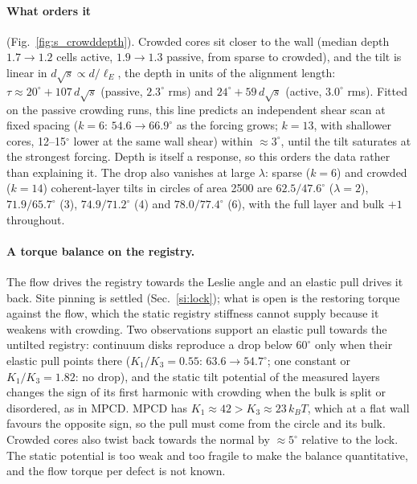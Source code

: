 \documentclass[aps,prl,onecolumn,superscriptaddress,amsmath,amssymb,nofootinbib]{revtex4-2}
\newcommand{\kT}{k_BT}
\begin{document}
\paragraph{What orders it} (Fig.~\ref{fig:s_crowddepth}). Crowded cores sit closer to the wall (median depth $1.7\to1.2$ cells active, $1.9\to1.3$ passive, from sparse to crowded), and
the tilt is linear in $d\sqrt{s}\propto d/\ell_E$, the depth in units of the alignment length: $\tau\approx20^\circ+107\,d\sqrt{s}$ (passive, $2.3^\circ$ rms) and $24^\circ+59\,d\sqrt{s}$
(active, $3.0^\circ$ rms). Fitted on the passive crowding runs, this line predicts an independent shear scan at fixed spacing ($k=6$: $54.6\to66.9^\circ$ as the forcing grows; $k=13$,
with shallower cores, 12--15$^\circ$ lower at the same wall shear) within $\approx3^\circ$, until the tilt saturates at the strongest forcing. Depth is itself a response, so this orders
the data rather than explaining it. The drop also vanishes at large $\lambda$: sparse ($k=6$) and crowded ($k=14$) coherent-layer tilts in circles of area 2500 are $62.5/47.6^\circ$
($\lambda=2$), $71.9/65.7^\circ$ (3), $74.9/71.2^\circ$ (4) and $78.0/77.4^\circ$ (6), with the full layer and bulk $+1$ throughout.

\paragraph{A torque balance on the registry.} The flow drives the registry towards the Leslie angle and an elastic pull drives it back. Site pinning is settled
(Sec.~\ref{si:lock}); what is open is the restoring torque against the flow, which the static registry stiffness cannot supply because it weakens with crowding. Two observations support
an elastic pull towards the untilted registry: continuum disks reproduce a drop below $60^\circ$ only when their elastic pull points there ($K_1/K_3=0.55$: $63.6\to54.7^\circ$; one
constant or $K_1/K_3=1.82$: no drop), and the static tilt potential of the measured layers changes the sign of its first harmonic with crowding when the bulk is split or disordered, as
in MPCD. MPCD has $K_1\approx42>K_3\approx23\,\kT$, which at a flat wall favours the opposite sign, so the pull must come from the circle and its bulk. Crowded cores also twist back
towards the normal by $\approx5^\circ$ relative to the lock. The static potential is too weak and too fragile to make the balance quantitative, and the flow torque per defect is not
known.
\end{document}
